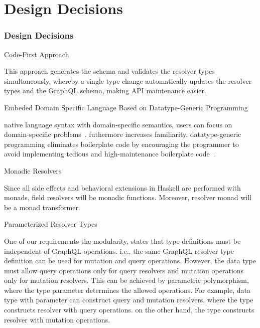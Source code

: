 
\section{Design Decisions} 

\begin{frame}\frametitle{Design Decisions}
\begin{alertblock}{Code-First Approach}  

This approach generates the schema and validates the resolver types simultaneously, whereby a single type change automatically updates the resolver types and the GraphQL schema, making API maintenance easier.

\end{alertblock}

\begin{alertblock}{Embeded Domain Specific Language Based on Datatype-Generic Programming}  

native language syntax with domain-specific semantics, users can focus on domain-specific problems~\cite{edsl-modeling}. futhermore increases familiarity. datatype-generic programming eliminates boilerplate code by encouraging the programmer to avoid implementing tedious and high-maintenance boilerplate code~\cite{scrap-your-boilerplate}.

\end{alertblock}

\begin{alertblock}{Monadic Resolvers} 

Since all side effects and behavioral extensions in Haskell are performed with monads, field resolvers will be monadic functions. 
Moreover, resolver monad will be a monad transformer. 

\end{alertblock}


\begin{alertblock}{Parameterized Resolver Types}

One of our requirements the modularity, states that type definitions must be independent of GraphQL operations. i.e., the same GraphQL resolver type definition can be used for mutation and query operations. However, the data type must allow query operations only for query resolvers and mutation operations only for mutation resolvers. This can be achieved by parametric polymorphism, where the type parameter determines the allowed operations. For example,  data type  with parameter  can construct query and mutation resolvers, where the type  constructs resolver  with query operations. on the other hand, the type  constructs resolver  with mutation operations.

\end{alertblock}
\end{frame}